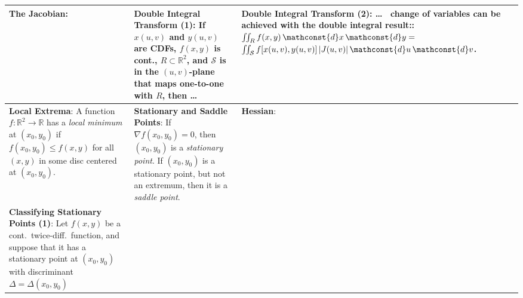 \begin{tabular}{|m{.31\linewidth}|m{.31\linewidth}|m{.31\linewidth}|}
\hline

\textbf{The Jacobian}:
    \smash{$
        J \coloneqq \det \left(
            \begin{array}{cc}
                \partial x/\partial u &
                \partial x/\partial v \\
                \partial y/\partial u &
                \partial y/\partial v
            \end{array}
        \right)
    $} &

\textbf{Double Integral Transform (1)}:
    If
        $ x(u, v) $ and
        $ y(u, v) $ are CDFs,
        $ f(x, y) $ is cont.,
        $ R \subset \mathbb{R}^2 $, and
        $ \mathcal{S} $ is in the $ (u, v) $-plane that maps one-to-one with
            $ R $,
    then \ldots&

\textbf{Double Integral Transform (2)}: \ldots\ %
    change of variables can be achieved with the double integral result::
    $ \iint_R f(x, y)
        \,\mathconst{d}x \,\mathconst{d}y = $
    $ \iint_\mathcal{S}
        f[ x(u, v), y(u, v) ]\,
        \vert J(u, v) \vert
        \,\mathconst{d}u\,\mathconst{d}v $. \\

\hline

\textbf{Local Extrema}:
    A function $ f \colon \mathbb{R}^2 \to \mathbb{R} $ has a \emph{local
    minimum} at $ (x_0, y_0) $ if $ f(x_0, y_0) \leq f(x, y) $ for all $ (x, y)
    $ in some disc centered at $ ( x_0, y_0 ) $. &

\textbf{Stationary and Saddle Points}:
    If
        $ \nabla f(x_0, y_0) = 0 $,
    then
        $ (x_0, y_0) $ is a \emph{stationary point}.
    If $ (x_0, y_0) $ is a stationary point, but not an extremum, then it is a
    \emph{saddle point}. &

\textbf{Hessian}:
    \smash{$
        \vert H(x, y) \vert \coloneqq \left\vert \left(
            \begin{array}{cc}
                f_{xx}(x, y) & f_{xy}(x, y) \\
                f_{yx}(x, y) & f_{yy}(x, y)
            \end{array}
        \right) \right\vert \eqqcolon \Delta
    $} \\

\hline

\textbf{Classifying Stationary Points (1)}:
    Let $ f(x, y) $ be a cont.\ twice-diff.\ function, and suppose that
    it has a stationary point at $ (x_0, y_0) $ with discriminant $ \Delta =
    \Delta (x_0, y_0) $ &


\end{tabular}
